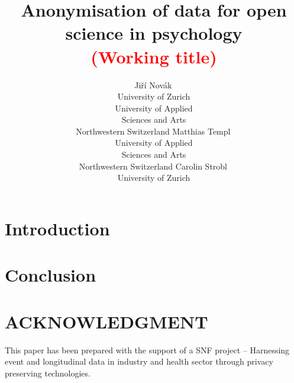 \documentclass[article]{ajs}
\title{Anonymisation of data for open science in psychology \\
\textcolor{red}{(Working title)} 
}
\author{
		Jiří Novák\,\orcidlink{0000-0003-0715-4769}\\ 
        University of Zurich \\
        University of Applied \\ Sciences and Arts \\ Northwestern Switzerland \And 
		Matthias Templ\,\orcidlink{0000-0002-8638-5276}\\ University of Applied \\ Sciences and Arts \\ Northwestern Switzerland \And 
        Carolin Strobl\,\orcidlink{0000-0003-0952-3230}\\ University of Zurich
        }
\begin{document}
\section{Introduction}



\section{Conclusion}


\section{ACKNOWLEDGMENT}

This paper has been prepared with the support of a SNF project – Harnessing event and longitudinal data in industry and health sector through privacy preserving technologies. 


%

\end{document}
